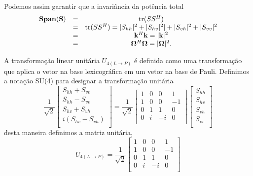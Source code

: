 Podemos assim garantir que a invariância da potência total 
\begin{equation}\label{span_invariante}
\begin{array}{ccc}
\mathbf{Span(S)} &=& \operatorname{tr}(SS^H)\\
	   &=&  \operatorname{tr}(SS^H)=|S_{hh}|^2+|S_{hv}|^2|+|S_{vh}|^2+|S_{vv}|^2  \\
	   &=&  \mathbf{k}^H\mathbf{k}=|\mathbf{k}|^2\\
	   &=& \mathbf{\Omega}^H\mathbf{\Omega}=|\mathbf{\Omega}|^2.
\end{array}
\end{equation}

A transformação linear unitária $U_{4(L \rightarrow P)}$ é definida como uma transformação que aplica o vetor na base lexicográfica em um vetor na base de Pauli. Definimos a notação \textrm{SU(4)} para designar a transformação  unitária
\begin{equation}\label{trans_matriz_unit_su4}
\frac{1}{\sqrt{2}}\left[
\begin{array}{c}
	  S_{hh} +  S_{vv}\\  
	  S_{hh} -  S_{vv}\\
	  S_{hv} +  S_{vh} \\
        i(S_{hv} -  S_{vh}) \\
\end{array}
\right]=\frac{1}{\sqrt{2}}	
\left[
\begin{array}{rrrr}
	1   & 0 & 0 & 1  \\
	1   & 0 & 0 & -1  \\
	0   & 1 & 1 & 0  \\
	0   & i & -i &0   \\
\end{array}
\right]
\left[
\begin{array}{c}
	S_{hh} \\  
	S_{hv} \\
	S_{vh} \\
	S_{vv} \\
\end{array}
\right]
\end{equation}
desta maneira definimos a matriz unitária,
\begin{equation}\label{matriz_unit_su4}
U_{4(L \rightarrow P)}=	\frac{1}{\sqrt{2}}	
\left[
\begin{array}{rrrr}
	1   & 0 & 0 & 1  \\
	1   & 0 & 0 & -1  \\
	0   & 1 & 1 & 0  \\
	0   & i & -i &0   \\
\end{array}
\right]
\end{equation}


